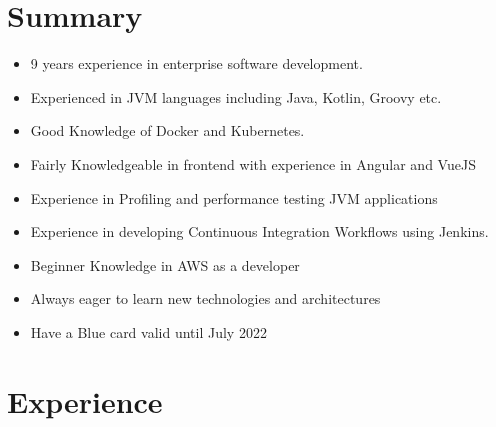 \documentclass[letterpaper]{twentysecondcv} %
\begin{document}
\section{Summary}
\begin{itemize}[leftmargin=*]
	\item 9 years experience in enterprise software development.
	\item Experienced in JVM languages including Java, Kotlin, Groovy etc.
	\item Good Knowledge of Docker and Kubernetes.
	\item Fairly Knowledgeable in frontend with experience in Angular and VueJS
	\item Experience in Profiling and performance testing JVM applications
	\item Experience in developing Continuous Integration Workflows using Jenkins.
	\item Beginner Knowledge in AWS as a developer
	\item Always eager to learn new technologies and architectures
	\item Have a Blue card valid until July 2022
\end{itemize}

\vspace{12 pt}

\section{Experience}
\end{document}

